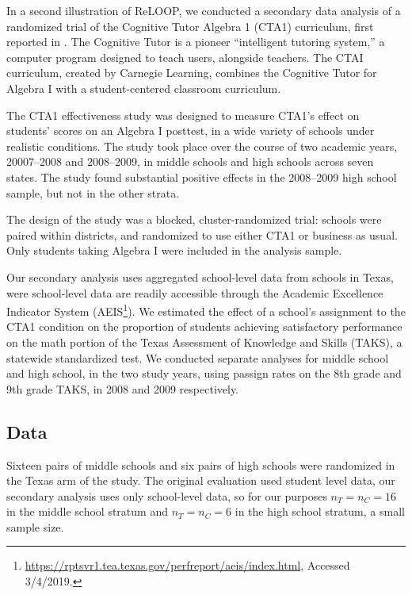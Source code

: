 
In a second illustration of ReLOOP, we conducted a secondary data
analysis of a randomized trial of the Cognitive Tutor Algebra 1 (CTA1)
curriculum, first reported in \citet{ctaiEval}.
The Cognitive Tutor is a pioneer ``intelligent tutoring system,''
a computer program designed to teach users, alongside teachers.
The CTAI curriculum, created by Carnegie Learning, combines the
Cognitive Tutor for Algebra I with a student-centered classroom
curriculum.

The CTA1 effectiveness study was designed to measure CTA1's effect on
students' scores on an Algebra I posttest, in a wide variety of
schools under realistic conditions.
The study took place over the course of two academic years,
20007--2008 and 2008--2009, in middle schools and high schools across
seven states.
The study found substantial positive effects in the 2008--2009 high
school sample, but not in the other strata.

The design of the study was a blocked, cluster-randomized trial:
schools were paired within districts, and randomized to use either
CTA1 or business as usual.
Only students taking Algebra I were included in the analysis sample.

Our secondary analysis uses aggregated school-level data from schools
in Texas, were school-level data are readily accessible through the
Academic Excellence Indicator
System (AEIS\footnote{\url{https://rptsvr1.tea.texas.gov/perfreport/aeis/index.html},
  Accessed 3/4/2019.}).
We estimated the effect of a school's assignment to the CTA1 condition
on the proportion of students achieving satisfactory performance on
the math portion of the Texas Assessment of Knowledge and Skills
(TAKS), a statewide standardized test.
We conducted separate analyses for middle school and high school, in
the two study years,
using passign rates on the 8th grade and 9th grade TAKS, in 2008 and 2009
respectively.

\subsection{Data}




Sixteen pairs of middle schools and six pairs of high schools were
randomized in the Texas arm of the study.
The original evaluation used student level data, our secondary
analysis uses only school-level data, so for our purposes $n_T=n_C=16$
in the middle school stratum and $n_T=n_C=6$ in the high school
stratum, a small sample size.

